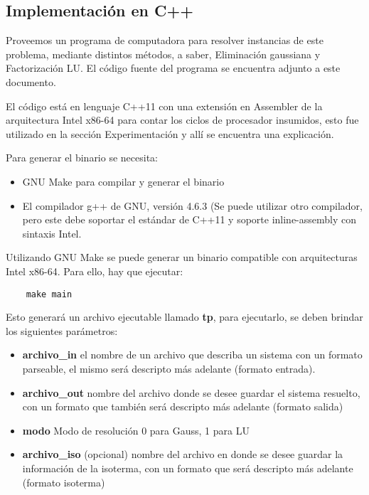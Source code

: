 \subsection{Implementación en C++}

Proveemos un programa de computadora para resolver instancias de este problema, mediante distintos métodos, a saber, Eliminación gaussiana y Factorización LU. El código fuente del programa se encuentra adjunto a este documento.

El código está en lenguaje C++11 con una extensión en Assembler de la arquitectura Intel x86-64 para contar los ciclos de procesador insumidos, esto fue utilizado en la sección Experimentación y allí se encuentra una explicación.

Para generar el binario se necesita:

\begin{itemize}
    \item GNU Make para compilar y generar el binario
    \item El compilador g++ de GNU, versión 4.6.3 (Se puede utilizar otro compilador, pero este debe soportar el estándar de C++11 y soporte inline-assembly con sintaxis Intel.
\end{itemize}

Utilizando GNU Make se puede generar un binario compatible con arquitecturas Intel x86-64. Para ello, hay que ejecutar:

\begin{verbatim}
    make main
\end{verbatim}

Esto generará un archivo ejecutable llamado \textbf{tp}, para ejecutarlo, se deben brindar los siguientes parámetros:

\begin{itemize}
    \item \textbf{archivo\_in} el nombre de un archivo que describa un sistema con un formato parseable, el mismo será descripto más adelante (formato entrada).
    \item \textbf{archivo\_out} nombre del archivo donde se desee guardar el sistema resuelto, con un formato que también será descripto más adelante (formato salida)
    \item \textbf{modo} Modo de resolución 0 para Gauss, 1 para LU
    \item \textbf{archivo\_iso} (opcional) nombre del archivo en donde se desee guardar la información de la isoterma, con un formato que será descripto más adelante (formato isoterma)
\end{itemize}


